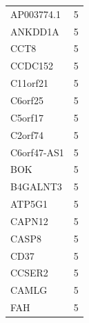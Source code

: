 \documentclass[a4paper,12pt]{article}
\begin{document}
\begin{longtable}{ll}
  AP003774.1    & 5                                                                                     \\
  ANKDD1A       & 5                                                                                     \\
  CCT8          & 5                                                                                     \\
  CCDC152       & 5                                                                                     \\
  C11orf21      & 5                                                                                     \\
  C6orf25       & 5                                                                                     \\
  C5orf17       & 5                                                                                     \\
  C2orf74       & 5                                                                                     \\
  C6orf47-AS1   & 5                                                                                     \\
  BOK           & 5                                                                                     \\
  B4GALNT3      & 5                                                                                     \\
  ATP5G1        & 5                                                                                     \\
  CAPN12        & 5                                                                                     \\
  CASP8         & 5                                                                                     \\
  CD37          & 5                                                                                     \\
  CCSER2        & 5                                                                                     \\
  CAMLG         & 5                                                                                     \\
  FAH           & 5                                                                                     \\

\end{longtable}
\end{document}

